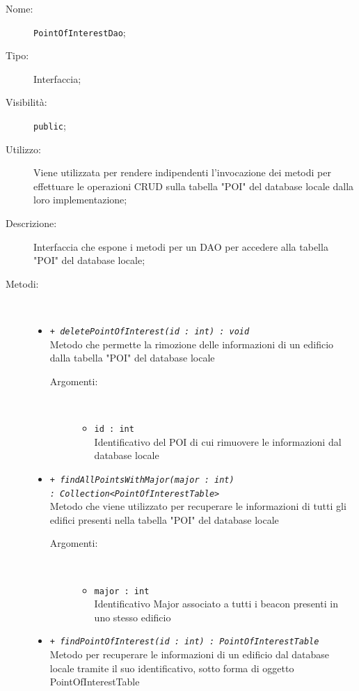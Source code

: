 \documentclass[../DefinizioneDiProdotto.tex]{subfiles}
\begin{document}
\begin{description}
	\item[Nome:] \texttt{PointOfInterestDao};
	\item[Tipo:] Interfaccia;
	\item[Visibilità:] \texttt{public};
	\item[Utilizzo:] Viene utilizzata per rendere indipendenti l'invocazione dei metodi per effettuare le operazioni CRUD sulla tabella "POI" del database locale dalla loro implementazione;
	\item[Descrizione:] Interfaccia che espone i metodi per un DAO per accedere alla tabella "POI" del database locale;
	\item[Metodi:] \
	\begin{itemize}
		\item \texttt{+ \textit{deletePointOfInterest(id : int) : void}}\\
		Metodo che permette la rimozione delle informazioni di un edificio dalla tabella "POI" del database locale 
		\begin{description}
			\item[Argomenti:] \
			\begin{itemize}
				\item \texttt{id : int}\\
				Identificativo del POI di cui rimuovere le informazioni dal database locale\end{itemize}
		\end{description}
		\item \texttt{+ \textit{findAllPointsWithMajor(major : int) \\ : Collection<PointOfInterestTable>}}\\
		Metodo che viene utilizzato per recuperare le informazioni di tutti gli edifici presenti nella tabella "POI" del database locale
		\begin{description}
			\item[Argomenti:] \
			\begin{itemize}
				\item \texttt{major : int}\\
				Identificativo Major associato a tutti i beacon presenti in uno stesso edificio\end{itemize}
		\end{description}
		\item \texttt{+ \textit{findPointOfInterest(id : int) : PointOfInterestTable}}\\
		Metodo per recuperare le informazioni di un edificio dal database locale tramite il suo identificativo, sotto forma di oggetto PointOfInterestTable

\end{itemize}
\end{description}
\end{document}
